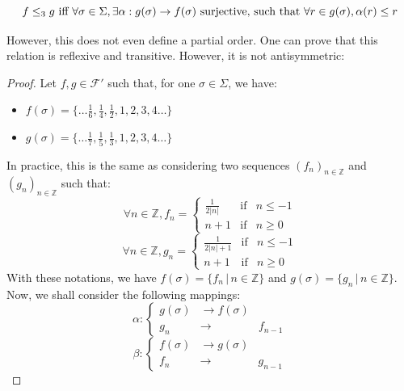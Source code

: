 \documentclass[a4paper,10pt]{llncs}
\def\ZZ {{\mathbb Z}}
\begin{document}
$$f \leq_3 g \textnormal{ iff } \forall \sigma \in \Sigma, \exists \alpha : g(\sigma) \rightarrow f(\sigma) \textnormal{ surjective, such that } \forall r \in g(\sigma), \alpha(r) \leq r$$

However, this does not even define a partial order. One can prove that this relation is reflexive and transitive. However, it is not antisymmetric:

\begin{proof}
Let $f,g \in \mathcal{F}'$ such that, for one $\sigma \in \Sigma$, we have:
\begin{itemize}
\item $f(\sigma) = \{\dots\frac{1}{6}, \frac{1}{4}, \frac{1}{2}, 1, 2, 3, 4 \dots\}$
\item $g(\sigma) = \{\dots\frac{1}{7}, \frac{1}{5}, \frac{1}{3}, 1, 2, 3, 4 \dots\}$
\end{itemize}
In practice, this is the same as considering two sequences $(f_n)_{n \in \ZZ}$ and $(g_n)_{n \in \ZZ}$ such that:
\begin{equation}
\forall n \in \ZZ, f_n=
\left\lbrace
\begin{array}{ccc}
\frac{1}{2|n|}  & \mbox{if} & n \leq -1\\
n+1 & \mbox{if} & n \geq 0
\end{array}\right.
\end{equation}
\begin{equation}
\forall n \in \ZZ, g_n=
\left\lbrace
\begin{array}{ccc}
\frac{1}{2|n|+1}  & \mbox{if} & n \leq -1\\
n+1 & \mbox{if} & n \geq 0
\end{array}\right.
\end{equation}
With these notations, we have $f(\sigma) = \{f_n \,|\, n \in \ZZ\}$ and $g(\sigma) = \{g_n \,|\, n \in \ZZ\}$.
Now, we shall consider the following mappings:
\begin{equation}
\alpha :
\left\lbrace
\begin{array}{ccc}
g(\sigma) & \rightarrow f(\sigma)\\
g_n & \rightarrow & f_{n-1}
\end{array}\right.
\end{equation}
\begin{equation}
\beta :
\left\lbrace
\begin{array}{ccc}
f(\sigma) & \rightarrow g(\sigma)\\
f_n & \rightarrow & g_{n-1}
\end{array}\right.
\end{equation}

\end{proof}
\end{document}
